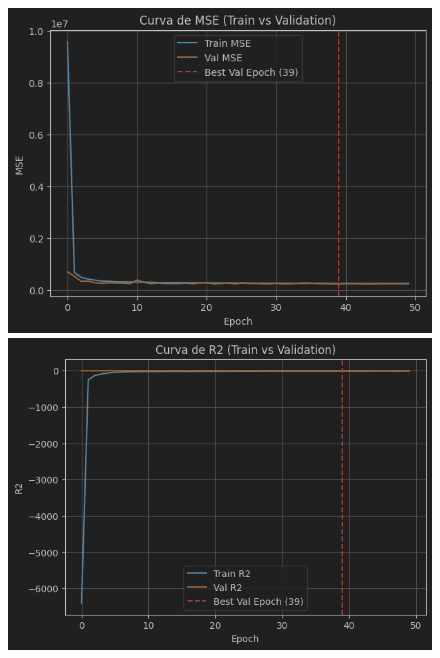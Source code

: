 \begin{figure}[H]
\begin{minipage}{0.48\textwidth}
	\end{minipage}
	\hfill
	\begin{minipage}{0.48\textwidth}
		\centering
		\includegraphics[width=\linewidth]{includes/cap5/graphs/sid5_mlp_mse.png}
		\vspace{0.2cm}
		\includegraphics[width=\linewidth]{includes/cap5/graphs/sid5_mlp_r2.png}
		\vspace{0.2cm}

\end{minipage}
\end{figure}
